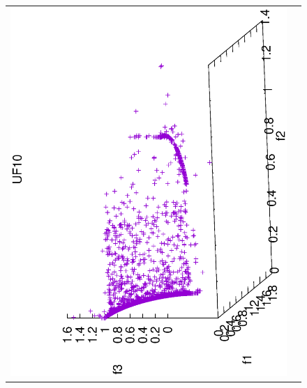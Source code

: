 \begin{figure}[H]
\begin{tabular}{cc}
 \includegraphics[scale=0.3, angle=-90,origin=c]{Figures_Chapter7/Results_Chapter4/Summary_Representative/VSD-MOEA/UF10.eps} &

\end{tabular}
\end{figure}
